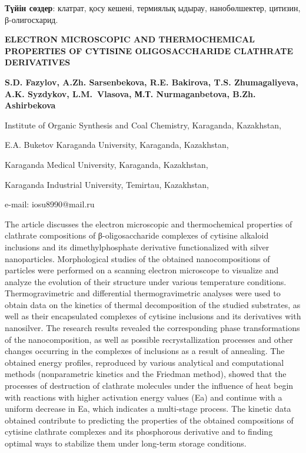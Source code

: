 {\bfseries Түйін сөздер}: клатрат, қосу кешені, термиялық ыдырау,
нанобөлшектер, цитизин, β-олигосхарид.

\begin{header}
{\bfseries ELECTRON MICROSCOPIC AND THERMOCHEMICAL PROPERTIES OF CYTISINE
OLIGOSACCHARIDE CLATHRATE DERIVATIVES}

{\bfseries
{}S.D. Fazylov\envelope,
A.Zh. Sarsenbekova,
R.E. Bakirova,
T.S. Zhumagaliyeva,
A.K. Syzdykov,
L.M.~Vlasova,
М.Т. Nurmaganbetova,
B.Zh. Ashirbekova
}
\end{header}

\begin{affil}
Institute of Organic Synthesis and Coal Chemistry, Karaganda, Kazakhstan,

E.A. Buketov Karaganda University, Karaganda, Kazakhstan,

Karaganda Medical University, Karaganda, Kazakhstan,

Karaganda Industrial University, Temirtau, Kazakhstan,

e-mail: iosu8990@mail.ru
\end{affil}

The article discusses the electron microscopic and thermochemical
properties of clathrate compositions of β-oligosaccharide complexes of
cytisine alkaloid inclusions and its dimethylphosphate derivative
func\-tionalized with silver nanoparticles. Morphological studies of the
obtained nanocompositions of particles were performed on a scanning
electron microscope to visualize and analyze the evolution of their
structure under various temperature conditions. Thermogravimetric and
differential thermogravimetric analyses were used to obtain data on the
kinetics of thermal decomposition of the studied substrates, as well as
their encapsulated complexes of cytisine inclusions and its derivatives
with nanosilver. The research results revealed the corresponding phase
transformations of the nanocomposition, as well as possible
recrystallization processes and other changes occurring in the complexes
of inclusions as a result of annealing. The obtained energy profiles,
reproduced by various analytical and computational methods
(nonparametric kinetics and the Friedman method), showed that the
processes of destruction of clathrate molecules under the influence of
heat begin with reactions with higher activation energy values (Ea) and
continue with a uniform decrease in Ea, which indicates a multi-stage
process. The kinetic data obtained contribute to predicting the
properties of the obtained compositions of cytisine clathrate complexes
and its phosphorous derivative and to finding optimal ways to stabilize
them under long-term storage conditions.

